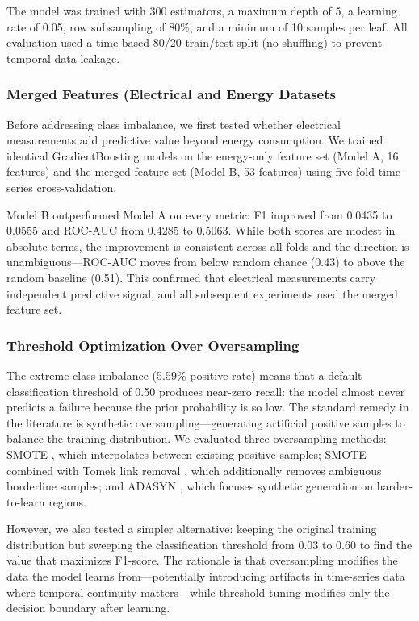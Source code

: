 \documentclass{article}
\begin{document}
The model was trained with 300 estimators, a maximum depth of 5, a learning rate of 0.05, row subsampling of 80\%, and a minimum of 10 samples per leaf. All evaluation used a time-based 80/20 train/test split (no shuffling) to prevent temporal data leakage.

\subsubsection{Merged Features (Electrical and Energy Datasets}

Before addressing class imbalance, we first tested whether electrical measurements add predictive value beyond energy consumption. We trained identical GradientBoosting models on the energy-only feature set (Model A, 16 features) and the merged feature set (Model B, 53 features) using five-fold time-series cross-validation.

Model B outperformed Model A on every metric: F1 improved from 0.0435 to 0.0555 and ROC-AUC from 0.4285 to 0.5063. While both scores are modest in absolute terms, the improvement is consistent across all folds and the direction is unambiguous---ROC-AUC moves from below random chance (0.43) to above the random baseline (0.51). This confirmed that electrical measurements carry independent predictive signal, and all subsequent experiments used the merged feature set.

\subsubsection{Threshold Optimization Over Oversampling}

The extreme class imbalance (5.59\% positive rate) means that a default classification threshold of 0.50 produces near-zero recall: the model almost never predicts a failure because the prior probability is so low. The standard remedy in the literature is synthetic oversampling---generating artificial positive samples to balance the training distribution. We evaluated three oversampling methods: SMOTE \cite{chawla2002smote}, which interpolates between existing positive samples; SMOTE combined with Tomek link removal \cite{batista2004study}, which additionally removes ambiguous borderline samples; and ADASYN \cite{he2008adasyn}, which focuses synthetic generation on harder-to-learn regions.

However, we also tested a simpler alternative: keeping the original training distribution but sweeping the classification threshold from 0.03 to 0.60 to find the value that maximizes F1-score. The rationale is that oversampling modifies the data the model learns from---potentially introducing artifacts in time-series data where temporal continuity matters---while threshold tuning modifies only the decision boundary after learning.
\end{document}
